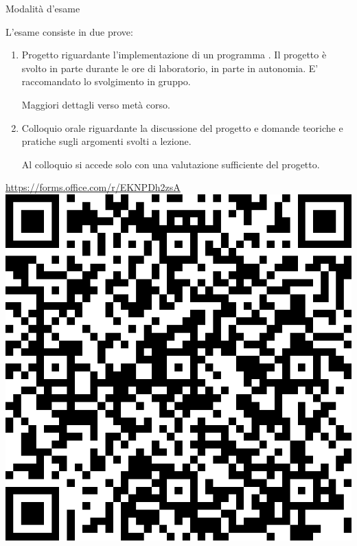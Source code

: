 \begin{frame}{Modalità d'esame}

  L'esame consiste in due prove:

  \begin{enumerate}

  \item Progetto riguardante l'implementazione di un programma \Cpp{}. Il progetto
    è svolto in parte durante le ore di laboratorio, in parte in autonomia. E'
    raccomandato lo svolgimento in gruppo.

    Maggiori dettagli verso metà corso.

  \item Colloquio orale riguardante la discussione del progetto e domande
    teoriche e pratiche sugli argomenti svolti a lezione.

    Al colloquio si accede solo con una valutazione sufficiente del progetto.

  \end{enumerate}

\end{frame}

\begin{frame}
  \begin{center}
    \vfill
    \url{https://forms.office.com/r/EKNPDh2zsA}
    \vfill
    \includegraphics[height=.5\textheight]{images/sondaggio-qr.png}
    \vfill
  \end{center}
\end{frame}

